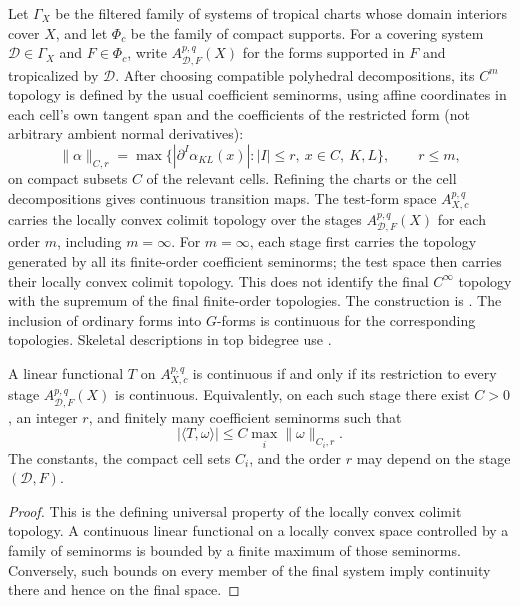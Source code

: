 Let $\Gamma_X$ be the filtered family of systems of tropical charts whose
domain interiors cover $X$, and let $\Phi_c$ be the family of compact
supports.  For a covering system $\mathscr D\in\Gamma_X$ and
$F\in\Phi_c$, write $A^{p,q}_{\mathscr D,F}(X)$ for the forms supported in
$F$ and tropicalized by $\mathscr D$.  After choosing compatible polyhedral
decompositions, its $C^m$ topology is defined by the usual coefficient
seminorms, using affine coordinates in each cell's own tangent span
and the coefficients of the restricted form (not arbitrary ambient normal
derivatives):
\[
 \|\alpha\|_{C,r}
 =\max\bigl\{|\partial^I\alpha_{KL}(x)|:
      |I|\leq r,\ x\in C,\ K,L\bigr\},
 \qquad r\leq m,
\]
on compact subsets $C$ of the relevant cells.  Refining the charts or the
cell decompositions gives continuous transition maps.  The test-form space
$A_{X,c}^{p,q}$ carries the locally convex colimit topology over the stages
$A^{p,q}_{\mathscr D,F}(X)$ for each order $m$, including $m=\infty$.
For $m=\infty$, each stage first carries the topology generated by all
its finite-order coefficient seminorms; the test space then carries their
locally convex colimit topology.  This does not identify the final
$C^\infty$ topology with the supremum of the final finite-order topologies.
The construction is \cite[\S\S3.6--3.7 and~6.4]{CLD25}.
The inclusion of ordinary forms into $G$-forms is continuous for the
corresponding topologies.  Skeletal descriptions in top bidegree use
\cite[\S5.2]{CLD25}.

\begin{proposition}\label{prop:test-form-continuity-criterion}
A linear functional $T$ on $A_{X,c}^{p,q}$ is continuous if and only if its
restriction to every stage $A^{p,q}_{\mathscr D,F}(X)$ is continuous.
Equivalently, on each such stage there exist $C>0$, an integer $r$, and
finitely many coefficient seminorms such that
\[
                |\langle T,\omega\rangle|
               \leq C\max_i\|\omega\|_{C_i,r}.
\]
The constants, the compact cell sets $C_i$, and the order $r$ may depend on
the stage $(\mathscr D,F)$.
\end{proposition}
\begin{proof}
This is the defining universal property of the locally convex colimit
topology.  A continuous
linear functional on a locally convex space controlled by a family of
seminorms is bounded by a finite maximum of those seminorms.  Conversely,
such bounds on every member of the final system imply continuity there and
hence on the final space.
\end{proof}

